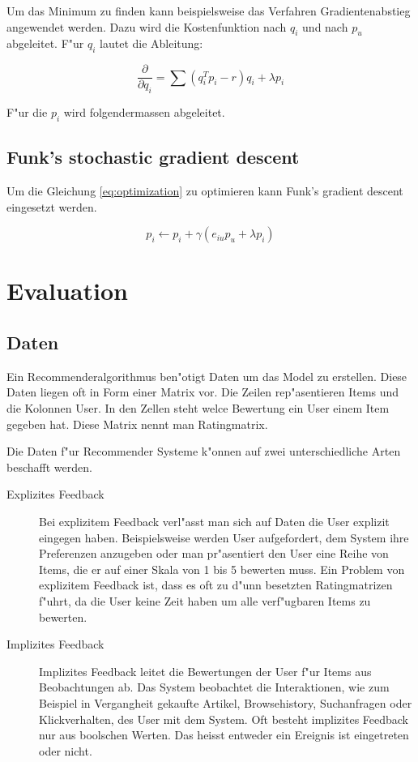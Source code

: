 \documentclass[a4paper, 11pt]{article}
\begin{document}
Um das Minimum zu finden kann beispielsweise das Verfahren Gradientenabstieg angewendet werden. Dazu wird die Kostenfunktion nach $q_i$ und nach $p_u$ abgeleitet. F"ur $q_i$ lautet die Ableitung:

\begin{equation}
  \label{eq:decx}
  \frac{ \partial }{ \partial q_i } = \sum (q_i^T p_i - r) q_i + \lambda p_i
\end{equation}

F"ur die $p_i$ wird folgendermassen abgeleitet.

\subsection{Funk's stochastic gradient descent}
\label{sec:funksvd}

Um die Gleichung \ref{eq:optimization} zu optimieren kann Funk's gradient descent eingesetzt werden.

\begin{equation}
  \label{eq:funksvd}
  p_i \leftarrow p_i + \gamma (e_{iu} p_u + \lambda p_i)
\end{equation}

\section{Evaluation}
\label{sec:evaluation}

\subsection{Daten}
\label{sec:data}

Ein Recommenderalgorithmus ben"otigt Daten um das Model zu erstellen. Diese Daten liegen oft in Form einer Matrix vor. Die Zeilen rep"asentieren Items und die Kolonnen User. In den Zellen steht welce Bewertung ein User einem Item gegeben hat. Diese Matrix nennt man Ratingmatrix.

Die Daten f"ur Recommender Systeme k"onnen auf zwei unterschiedliche Arten beschafft werden.

\begin{description}
\item[Explizites Feedback] Bei explizitem Feedback verl"asst man sich auf Daten die User explizit eingegen haben. Beispielsweise werden User aufgefordert, dem System ihre Preferenzen anzugeben oder man pr"asentiert den User eine Reihe von Items, die er auf einer Skala von 1 bis 5 bewerten muss. Ein Problem von explizitem Feedback ist, dass es oft zu d"unn besetzten Ratingmatrizen f"uhrt, da die User keine Zeit haben um alle verf"ugbaren Items zu bewerten.
\item[Implizites Feedback] Implizites Feedback leitet die Bewertungen der User f"ur Items aus Beobachtungen ab. Das System beobachtet die Interaktionen, wie zum Beispiel in Vergangheit gekaufte Artikel, Browsehistory, Suchanfragen oder Klickverhalten, des User mit dem System. Oft besteht implizites Feedback nur aus boolschen Werten. Das heisst entweder ein Ereignis ist eingetreten oder nicht.
\end{description}
\end{document}
